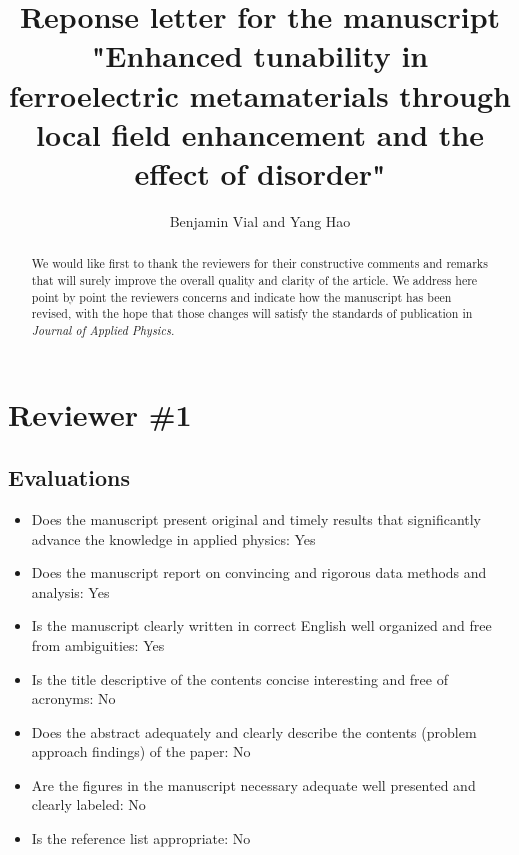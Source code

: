 \documentclass[%
 aip,
 amsmath,amssymb,
 reprint,%
]{revtex4-1}
\begin{document}
\title{Reponse letter for the manuscript "Enhanced tunability in ferroelectric metamaterials through local field enhancement and the effect of disorder"}
\author{Benjamin Vial and Yang Hao}



%

\begin{abstract}
 We would like first to thank the reviewers for their constructive comments and remarks that will surely
 improve the overall quality and clarity of the article. We address here point by point the reviewers concerns and indicate how the manuscript has been revised, with the hope that those changes will satisfy the standards of publication in \textit{Journal of Applied Physics.}
\end{abstract}

\maketitle


\section{Reviewer \#1}
\subsection{Evaluations}
\begin{itemize}
  \item Does the manuscript present original and timely results that significantly advance the knowledge in applied physics: Yes
  \item Does the manuscript report on convincing and rigorous data methods and analysis: Yes
  \item Is the manuscript clearly written in correct English well organized and free from ambiguities: Yes
  \item Is the title descriptive of the contents concise interesting and free of acronyms: No
  \item Does the abstract adequately and clearly describe the contents (problem approach findings) of the paper: No
  \item Are the figures in the manuscript necessary adequate well presented and clearly labeled: No
  \item Is the reference list appropriate: No

\end{itemize}
\end{document}
